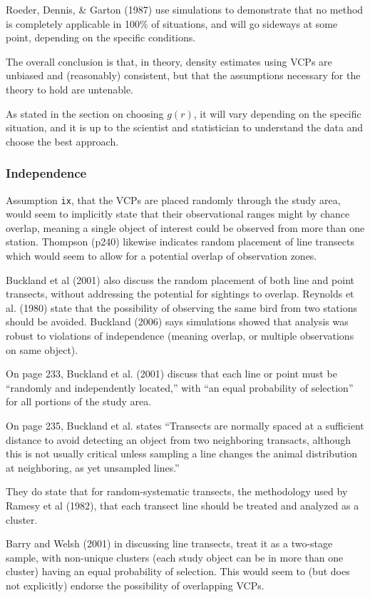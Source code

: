 \documentclass[12pt]{article}
\begin{document}
Roeder, Dennis, \& Garton (1987) use simulations to demonstrate that no method is completely applicable in 100\% of situations, and will go sideways at some point, depending on the specific conditions.

The overall conclusion is that, in theory, density estimates using VCPs are unbiased and (reasonably) consistent, but that the assumptions necessary for the theory to hold are untenable. 

As stated in the section on choosing $g(r)$, it will vary depending on the specific situation, and it is up to the scientist and statistician to understand the data and choose the best approach.

\subsubsection{Independence}
Assumption \texttt{ix}, that the VCPs are placed randomly through the study area, would seem to implicitly state that their observational ranges might by chance overlap, meaning a single object of interest could be observed from more than one station. Thompson (p240) likewise indicates random placement of line transects which would seem to allow for a potential overlap of observation zones. 

Buckland et al (2001) also discuss the random placement of both line and point transects, without addressing the potential for sightings to overlap. Reynolds et al. (1980) state that the possibility of observing the same bird from two stations should be avoided. Buckland (2006) says simulations showed that analysis was robust to violations of independence (meaning overlap, or multiple observations on same object).

On page 233, Buckland et al. (2001) discuss that each line or point must be ``randomly and independently located,'' with ``an equal probability of selection'' for all portions of the study area.

On page 235, Buckland et al. states ``Transects are normally spaced at a sufficient distance to avoid detecting an object from two neighboring transacts, although this is not usually critical unless sampling a line changes the animal distribution at neighboring, as yet unsampled lines.''

They do state that for random-systematic transects, the methodology used by Ramesy et al (1982), that each transect line should be treated and analyzed as a cluster.

Barry and Welsh (2001) in discussing line transects, treat it as a two-stage sample, with non-unique clusters (each study object can be in more than one cluster) having an equal probability of selection. This would seem to (but does not explicitly) endorse the possibility of overlapping VCPs. 
\end{document}
